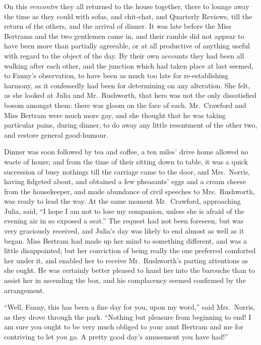 On this \emph{rencontre} they all returned to the house together,
there to lounge away the time as they could with sofas,
and chit-chat, and Quarterly Reviews, till the return
of the others, and the arrival of dinner.  It was late
before the Miss Bertrams and the two gentlemen came in,
and their ramble did not appear to have been more than
partially agreeable, or at all productive of anything
useful with regard to the object of the day.  By their
own accounts they had been all walking after each other,
and the junction which had taken place at last seemed,
to Fanny's observation, to have been as much too late
for re-establishing harmony, as it confessedly had
been for determining on any alteration.  She felt,
as she looked at Julia and Mr.\ Rushworth, that hers
was not the only dissatisfied bosom amongst them:
there was gloom on the face of each.  Mr.\ Crawford
and Miss Bertram were much more gay, and she thought
that he was taking particular pains, during dinner,
to do away any little resentment of the other two,
and restore general good-humour.

Dinner was soon followed by tea and coffee, a ten miles'
drive home allowed no waste of hours; and from the time
of their sitting down to table, it was a quick succession
of busy nothings till the carriage came to the door,
and Mrs.\ Norris, having fidgeted about, and obtained a
few pheasants' eggs and a cream cheese from the housekeeper,
and made abundance of civil speeches to Mrs.\ Rushworth,
was ready to lead the way.  At the same moment Mr.\ Crawford,
approaching Julia, said, ``I hope I am not to lose
my companion, unless she is afraid of the evening air
in so exposed a seat.''  The request had not been foreseen,
but was very graciously received, and Julia's day was
likely to end almost as well as it began.  Miss Bertram
had made up her mind to something different, and was a
little disappointed; but her conviction of being really
the one preferred comforted her under it, and enabled her
to receive Mr.\ Rushworth's parting attentions as she ought.
He was certainly better pleased to hand her into
the barouche than to assist her in ascending the box,
and his complacency seemed confirmed by the arrangement.

``Well, Fanny, this has been a fine day for you, upon my word,''
said Mrs.\ Norris, as they drove through the park.
``Nothing but pleasure from beginning to end!  I am sure
you ought to be very much obliged to your aunt Bertram
and me for contriving to let you go.  A pretty good day's
amusement you have had!''


